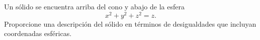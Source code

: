 \item Un sólido se encuentra arriba del cono y abajo de la esfera
    \[
    x^2+y^2+z^2=z.
    \]
    Proporcione una descripción del sólido en términos de desigualdades que incluyan coordenadas esféricas.
